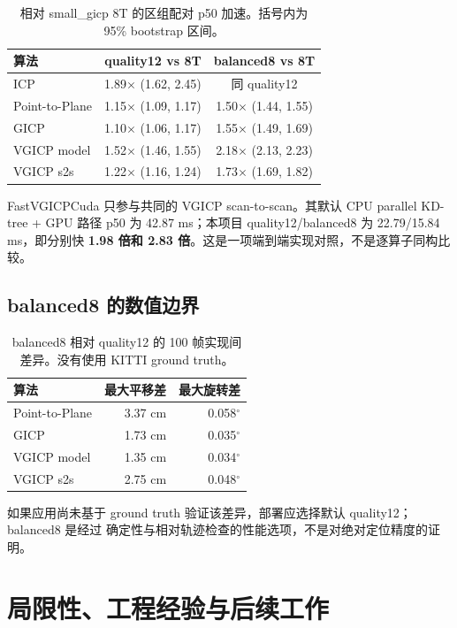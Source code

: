 \documentclass[UTF8,a4paper,11pt,fontset=none]{ctexart}
\newcommand{\metric}[1]{\textbf{\color{ReportBlue}#1}}
\begin{document}
\begin{table}[H]
  \centering
  \small
  \caption{相对 small\_gicp 8T 的区组配对 p50 加速。括号内为 95\% bootstrap 区间。}
  \begin{tabular}{@{}lcc@{}}
    \toprule
    算法 & quality12 vs 8T & balanced8 vs 8T \\
    \midrule
    ICP & 1.89$\times$ (1.62, 2.45) & 同 quality12 \\
    Point-to-Plane & 1.15$\times$ (1.09, 1.17) & 1.50$\times$ (1.44, 1.55) \\
    GICP & 1.10$\times$ (1.06, 1.17) & 1.55$\times$ (1.49, 1.69) \\
    VGICP model & 1.52$\times$ (1.46, 1.55) & 2.18$\times$ (2.13, 2.23) \\
    VGICP s2s & 1.22$\times$ (1.16, 1.24) & 1.73$\times$ (1.69, 1.82) \\
    \bottomrule
  \end{tabular}
\end{table}

FastVGICPCuda 只参与共同的 VGICP scan-to-scan。其默认 CPU parallel KD-tree + GPU 路径
p50 为 42.87 ms；本项目 quality12/balanced8 为 22.79/15.84 ms，即分别快
\metric{1.98 倍和 2.83 倍}。这是一项端到端实现对照，不是逐算子同构比较。

\subsection{balanced8 的数值边界}

\begin{table}[H]
  \centering
  \small
  \caption{balanced8 相对 quality12 的 100 帧实现间差异。没有使用 KITTI ground truth。}
  \begin{tabular}{@{}lrr@{}}
    \toprule
    算法 & 最大平移差 & 最大旋转差 \\
    \midrule
    Point-to-Plane & 3.37 cm & 0.058$^\circ$ \\
    GICP & 1.73 cm & 0.035$^\circ$ \\
    VGICP model & 1.35 cm & 0.034$^\circ$ \\
    VGICP s2s & 2.75 cm & 0.048$^\circ$ \\
    \bottomrule
  \end{tabular}
\end{table}

如果应用尚未基于 ground truth 验证该差异，部署应选择默认 quality12；balanced8 是经过
确定性与相对轨迹检查的性能选项，不是对绝对定位精度的证明。

\section{局限性、工程经验与后续工作}
\end{document}
